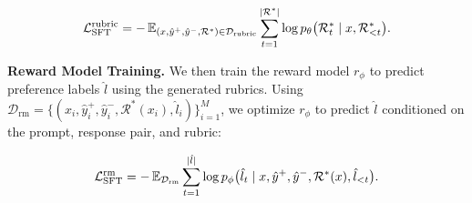 \begin{small}
\begin{equation}
\setlength{\abovedisplayskip}{-5pt}
\setlength{\belowdisplayskip}{5pt}
\mathcal{L}_{\text{SFT}}^{\text{rubric}}
= -\,\mathbb{E}_{(x, \hat{y}^{+}, \hat{y}^{-}, \mathcal{R}^*) \in \mathcal{D}_{\text{rubric}}}
\sum_{t=1}^{|\mathcal{R}^*|}
\log p_\theta \big(\mathcal{R}^*_t \mid x, \mathcal{R}^*_{<t}\big).
\nonumber
\end{equation}
\end{small}


\noindent \textbf{Reward Model Training.}
We then train the reward model $r_\phi$ to predict preference labels $\hat{l}$ using the generated rubrics. Using $\mathcal{D}_{\text{rm}} = \{(x_i, \hat{y}_i^{+}, \hat{y}_i^{-}, \mathcal{R}^*(x_i), \hat{l}_i)\}_{i=1}^{M}$, we optimize $r_\phi$ to predict $\hat{l}$ conditioned on the prompt, response pair, and rubric:

\begin{small}
\begin{equation}
\setlength{\abovedisplayskip}{-8pt}
\setlength{\belowdisplayskip}{5pt}
\mathcal{L}_{\text{SFT}}^{\text{rm}}
= -\,\mathbb{E}_{\mathcal{D}_{\text{rm}}}
\sum_{t=1}^{|\hat{l}|}
\log p_\phi \big(\hat{l}_t \mid x, \hat{y}^{+}, \hat{y}^{-}, \mathcal{R}^*(x), \hat{l}_{<t}\big).
\nonumber
\end{equation}
\end{small}

    


